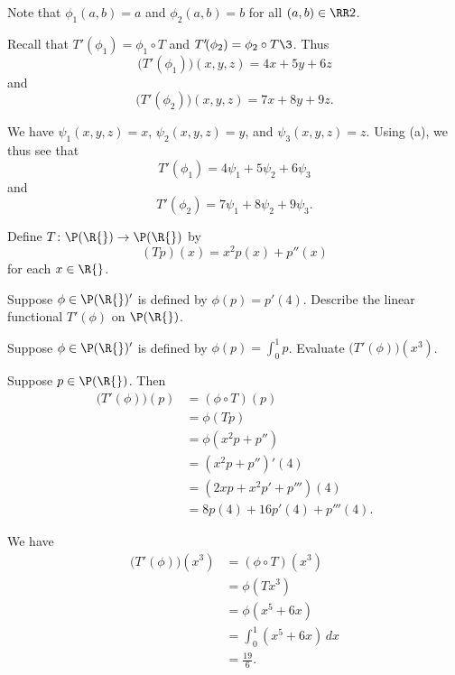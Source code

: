 \begin{Solution}
\begin{subtheorem}
\item
Note that $\phi_1(a,b) = a$ and $\phi_2(a, b) = b$ for all $(a, b) \in \RR2$.

Recall that $T' \! (\phi_1) = \phi_1 \circ T$ and $T' \! (\phi_2) = \phi_2 \circ T\3$. Thus
\[
\bigl( T' \! (\phi_1) \bigr)(x, y, z) = 4x + 5y + 6z
\]
and
\[
\bigl( T' \! (\phi_2) \bigr)(x, y, z) = 7x + 8y + 9z.
\]

\item
We have $\psi_1(x, y, z) = x$, $\psi_2(x, y, z) = y$, and $\psi_3(x, y, z) = z$. Using (a), we thus see that
\[
T' \! (\phi_1) = 4 \psi_1 + 5 \psi_2 + 6 \psi_3
\]
and
\[
T' \! (\phi_2) = 7 \psi_1 + 8 \psi_2 + 9 \psi_3.
\]
\end{subtheorem}
\end{Solution}

\exercise
Define $T \colon \P(\R{})\to \P(\R{})$ by
\[
(Tp)(x) = x^2 p(x) + p'' \! (x)
\]
for each $x \in \R{}$.
\begin{subtheorem}
\item
Suppose $\phi \in \P(\R{})'$ is defined by \mbox{$\phi(p) = p' \! (4)$}.
Describe the linear functional $T' \! (\phi)$ on $\P(\R{})$.
\item
Suppose $\phi \in \P(\R{})'$ is defined by
$
\phi(p) = \int_0^1 p$.
Evaluate $\bigl(T' \! (\phi)\bigr)(x^3)$.
\end{subtheorem}
\exercisesubtheoremend

\begin{Solution}
\begin{subtheorem}
\item
Suppose $p \in \P(\R{})$. Then
\begin{align*}
\bigl( T' \! (\phi) \bigr)(p) &= (\phi \circ T)(p) \\
&= \phi ( Tp ) \\
&= \phi( x^2 p + p'') \\
&= (x^2 p + p'')' \! (4) \\
&= (2xp + x^2 p '+ p''')(4) \\
&= 8p(4) + 16 p' \! (4) + p''' \! (4).
\end{align*}

\item
We have
\begin{align*}
\bigl( T' \! (\phi) \bigr)(x^3) &= (\phi \circ T)(x^3) \\
&= \phi ( Tx^3 ) \\
&= \phi ( x^5 + 6x) \\
&= \int_0^1 (x^5 + 6x) \, dx \\[3bp]
&= \frac{19}{6}.
\end{align*}
\end{subtheorem}
\end{Solution}

